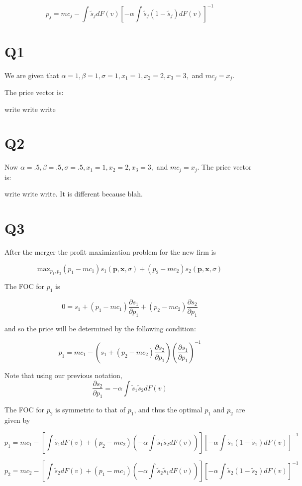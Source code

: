 \documentclass{article}
\newcommand{\1}{\mathbbm{1}}
\begin{document}
$$p_j = mc_j - \int \tilde{s}_j dF(v)[ -\alpha \int \tilde{s}_j(1-\tilde{s}_j)dF(v)]^{-1}$$

\section{Q1}
We are given that $\alpha = 1, \beta = 1, \sigma = 1, x_1 = 1, x_2 = 2, x_3 = 3,$ and $mc_j = x_j$. 

The price vector is: 

\color{red}
write write write
\color{black}

\section{Q2}
Now $\alpha = .5, \beta = .5, \sigma = .5, x_1 = 1, x_2 = 2, x_3 = 3,$ and $mc_j = x_j$. 
The price vector is: 

\color{red}
write write write. It is different because blah.
\color{black}


\section{Q3}
After the merger the profit maximization problem for the new firm is  

$$\text{max}_{p_1, p_2} (p_1 - mc_1)s_1(\bm p, \bm x, \sigma) + (p_2 - mc_2)s_2(\bm p, \bm x, \sigma)$$

The FOC for $p_1$ is 

$$0 = s_1 + (p_1 - mc_1)\frac{\partial s_1}{\partial p_1}   + (p_2 - mc_2)\frac{\partial s_2}{\partial p_1}$$

and so the price will be determined by the following condition:

$$p_1 = mc_1 - (s_1 + (p_2 - mc_2)\frac{\partial s_2}{\partial p_1})(\frac{\partial s_1}{\partial p_1})^{-1}$$

Note that using our previous notation,
$$\frac{\partial s_2}{\partial p_1} = - \alpha \int \tilde{s}_1\tilde{s}_2dF(v)$$

The FOC for $p_2$ is symmetric to that of $p_1$, and thus the optimal $p_1$ and $p_2$ are given by

$$p_1 = mc_1 - [\int \tilde{s}_1 dF(v) + (p_2 - mc_2)(- \alpha \int \tilde{s}_1\tilde{s}_2dF(v))][-\alpha \int \tilde{s}_1(1-\tilde{s}_1)dF(v)]^{-1}$$


$$p_2 = mc_2 - [\int \tilde{s}_2 dF(v) + (p_1 - mc_1)(- \alpha \int \tilde{s}_2\tilde{s}_1dF(v))][-\alpha \int \tilde{s}_2(1-\tilde{s}_2)dF(v)]^{-1}$$
\end{document}
